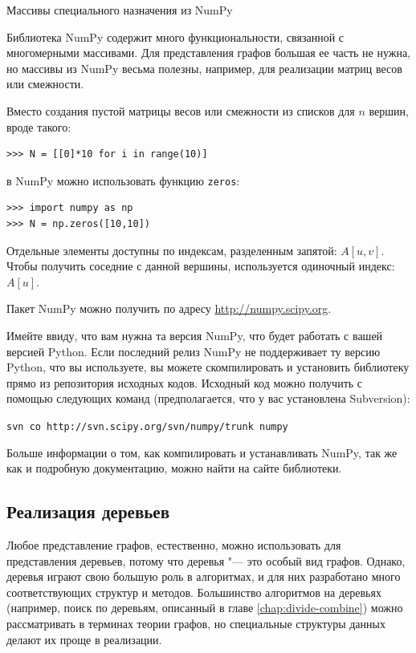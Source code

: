\begin{notice}{Массивы специального назначения из NumPy}

Библиотека NumPy содержит много функциональности, связанной с многомерными массивами. Для представления графов большая ее часть не нужна, но массивы из NumPy весьма полезны, например, для реализации матриц весов или смежности.

Вместо создания пустой матрицы весов или смежности из списков для $n$ вершин, вроде такого:
\begin{lstlisting}
>>> N = [[0]*10 for i in range(10)]
\end{lstlisting}
в NumPy можно использовать функцию \texttt{zeros}:
\begin{lstlisting}
>>> import numpy as np
>>> N = np.zeros([10,10])
\end{lstlisting}

Отдельные элементы доступны по индексам, разделенным запятой: $A[u,v]$. Чтобы получить соседние с данной вершины, используется одиночный индекс: $A[u]$.

Пакет NumPy можно получить по адресу \url{http://numpy.scipy.org}.

Имейте ввиду, что вам нужна та версия NumPy, что будет работать с вашей версией Python. Если последний релиз NumPy не поддерживает ту версию Python, что вы используете, вы можете скомпилировать и установить библиотеку прямо из репозитория исходных кодов. Исходный код можно получить с помощью следующих команд (предполагается, что у вас установлена Subversion):

\texttt{svn co http://svn.scipy.org/svn/numpy/trunk numpy}

Больше информации о том, как компилировать и устанавливать NumPy, так же как и подробную документацию, можно найти на сайте библиотеки.

\end{notice}

\subsection{Реализация деревьев}

Любое представление графов, естественно, можно использовать для представления деревьев, потому что деревья "--- это особый вид графов. Однако, деревья играют свою большую роль в алгоритмах, и для них разработано много соответствующих структур и методов. Большинство алгоритмов на деревьях (например, поиск по деревьям, описанный в главе \ref{chap:divide-combine}) можно рассматривать в терминах теории графов, но специальные структуры данных делают их проще в реализации. 

